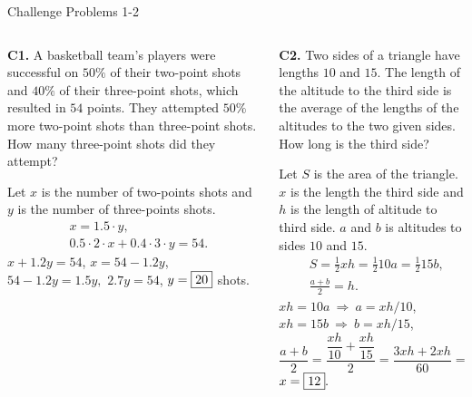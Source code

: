 \documentclass[9pt,aspectratio=169]{beamer}
\begin{document}
\begin{frame}{Challenge Problems 1-2}
  \begin{columns}[T]
    \begin{column}{0.5\textwidth}
      \begin{problem}
        \textbf{C1.} A basketball team's players were successful on $50\%$ of their two-point shots and $40\%$ of their three-point shots, which resulted in $54$ points. They attempted $50\%$ more two-point shots than three-point shots. How many three-point shots did they attempt?
      \end{problem}\pause
      Let $x$ is the number of two-points shots and $y$ is the number of three-points shots.
      \begin{align*}
        &x = 1{.}5\cdot y,\\
        &0.5\cdot 2 \cdot x + 0.4\cdot 3 \cdot y = 54.
      \end{align*}\pause
      $x + 1.2 y = 54$, $x = 54 - 1.2y$, $54 - 1.2 y = 1.5y,$ $2.7y = 54$, $y = \fbox{20}$ shots.\pause
    \end{column}
    \begin{column}{0.5\textwidth}
      \begin{problem}
        \textbf{C2.} Two sides of a triangle have lengths $10$ and $15$. The length of the altitude to the third side is the average of the lengths of the altitudes to the two given sides. How long is the third side?
      \end{problem}\pause
      Let $S$ is the area of the triangle. $x$ is the length the third side and $h$ is the length of altitude to third side. $a$ and $b$ is altitudes to sides $10$ and $15$.
      \begin{align*}
        &S = \frac{1}{2} xh = \frac{1}{2} 10a = \frac{1}{2} 15b,\\
        &\frac{a + b}{2} = h.
      \end{align*}\pause
      $xh = 10a\ \Rightarrow\ a = xh/10$, $xh = 15b\ \Rightarrow\ b = xh/15$, 
      \[ \frac{a + b}{2} = \frac{\dfrac{xh}{10} + \dfrac{xh}{15}}{2} = \frac{3xh + 2xh}{60} = \frac{5xh}{60} = \frac{xh}{12} = h.\]
      $x = \fbox{12}.$  
    \end{column}
  \end{columns}
\end{frame}
\end{document}
